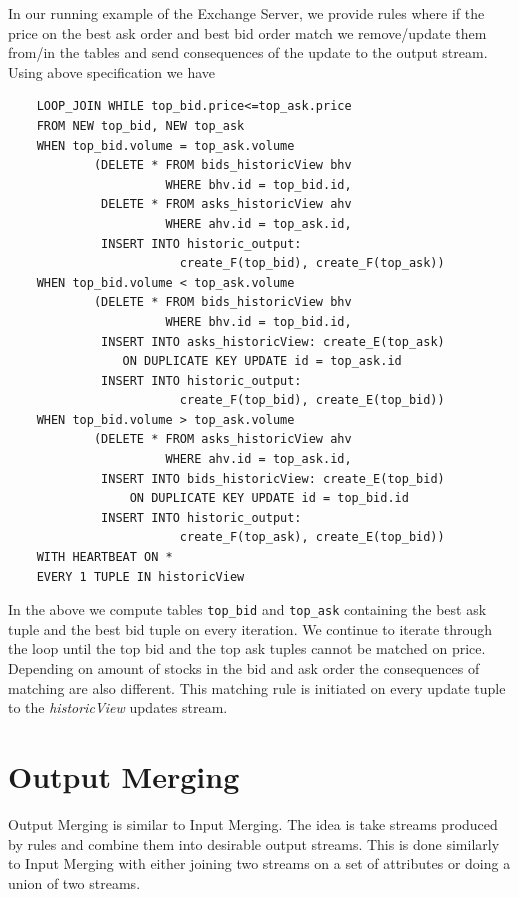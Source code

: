 \documentclass{article}
\begin{document}
In our running example of the Exchange Server, we provide rules where if the price on the best ask order and best bid order match we remove/update them from/in the tables and send consequences of the update to the output stream. Using above specification we have

\begin{verbatim}  
    LOOP_JOIN WHILE top_bid.price<=top_ask.price
    FROM NEW top_bid, NEW top_ask
    WHEN top_bid.volume = top_ask.volume 
            (DELETE * FROM bids_historicView bhv 
                      WHERE bhv.id = top_bid.id,
             DELETE * FROM asks_historicView ahv 
                      WHERE ahv.id = top_ask.id,
             INSERT INTO historic_output: 
                        create_F(top_bid), create_F(top_ask))
    WHEN top_bid.volume < top_ask.volume 
            (DELETE * FROM bids_historicView bhv 
                      WHERE bhv.id = top_bid.id,
             INSERT INTO asks_historicView: create_E(top_ask) 
                ON DUPLICATE KEY UPDATE id = top_ask.id
             INSERT INTO historic_output:
                        create_F(top_bid), create_E(top_bid))
    WHEN top_bid.volume > top_ask.volume 
            (DELETE * FROM asks_historicView ahv 
                      WHERE ahv.id = top_ask.id,
             INSERT INTO bids_historicView: create_E(top_bid) 
                 ON DUPLICATE KEY UPDATE id = top_bid.id
             INSERT INTO historic_output:
                        create_F(top_ask), create_E(top_bid))
    WITH HEARTBEAT ON *
    EVERY 1 TUPLE IN historicView
\end{verbatim}

In the above we compute tables {\tt top\_bid} and {\tt top\_ask} containing the best ask tuple and the best bid tuple on every iteration. We continue to iterate through the loop until the top bid and the top ask tuples cannot be matched on price. Depending on amount of stocks in the bid and ask order the consequences of matching are also different. This matching rule is initiated on every update tuple to the \emph{historicView} updates stream. 


\section{Output Merging}

Output Merging is similar to Input Merging. The idea is take streams produced by rules and combine them into desirable output streams. This is done similarly to Input Merging with either joining two streams on a set of attributes or doing a union of two streams.  
\end{document}
